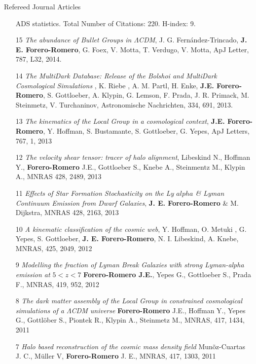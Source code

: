 \documentclass[9pt]{article}
\begin{document}
\indent
Refereed Journal Articles
\begin{enumerate}
\item[] ADS statistics. Total Number of Citations: 220. H-index: 9.
\item[15]{\it The abundance of Bullet Groups in $\Lambda$CDM},
  J. G. Fern\'andez-Trincado, {\bf J. E. Forero-Romero}, G. Foex,
  V. Motta, T. Verdugo, V. Motta, ApJ Letter, 787, L32, 2014.

\item[14]{\it The MultiDark Database: Release of the Bolshoi and MultiDark Cosmological Simulations} , K. Riebe , A. M. Partl, H. Enke, {\bf J.E. Forero-Romero}, S. Gottloeber, A. Klypin, G. Lemson, F. Prada, J. R. Primack, M. Steinmetz, V. Turchaninov, Astronomische Nachrichten, 334, 691, 2013.

\item[13] {\it The kinematics of the Local Group in a cosmological context}, 
{\bf J.E. Forero-Romero}, Y. Hoffman, S. Bustamante, S. Gottloeber, G. Yepes, ApJ Letters, 767, 1, 2013


\item[12] {\it The velocity shear tensor: tracer of halo alignment}, Libeskind N., Hoffman Y., {\bf Forero-Romero} J.E., Gottloeber S., Knebe A., Steinmentz M., Klypin A., MNRAS 428, 2489, 2013

\item[11] {\it Effects of Star Formation Stochasticity on the Ly $alpha$ \& Lyman Continuum Emission from Dwarf Galaxies}, {\bf J. E. Forero-Romero} \& M. Dijkstra, MNRAS 428, 2163, 2013

\item[10] {\it A kinematic classification of the cosmic web}, Y. Hoffman, O. Metuki , G. Yepes, S. Gottloeber, {\bf J. E. Forero-Romero}, N. I. Libeskind, A. Knebe, MNRAS, 425, 2049, 2012

\item[9] {\it Modelling the fraction of Lyman Break Galaxies with strong Lyman-alpha emission at $5 < z < 7$} {\bf Forero-Romero J.E.}, Yepes G., Gottloeber S., Prada F., MNRAS, 419, 952, 2012

\item [8]
{\it The dark matter assembly of the Local Group in constrained cosmological
  simulations of a $\Lambda$CDM universe} {\bf Forero-Romero} J.E., Hoffman Y., Yepes G., Gottl\"ober S.,
  Piontek R., Klypin A., Steinmetz M., 
MNRAS, 417, 1434, 2011

\item[7] 
{\it Halo based reconstruction of the cosmic mass density field}
Mun\~oz-Cuartas J. C., M\"uller V, {\bf Forero-Romero} J. E.,
MNRAS, 417, 1303, 2011


\end{enumerate}
\end{document}
